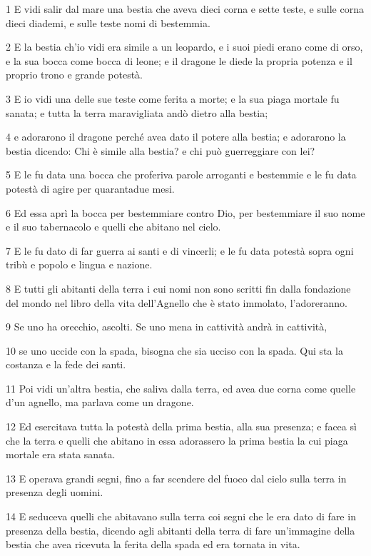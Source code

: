 \par 1 E vidi salir dal mare una bestia che aveva dieci corna e sette teste, e sulle corna dieci diademi, e sulle teste nomi di bestemmia.
\par 2 E la bestia ch'io vidi era simile a un leopardo, e i suoi piedi erano come di orso, e la sua bocca come bocca di leone; e il dragone le diede la propria potenza e il proprio trono e grande potestà.
\par 3 E io vidi una delle sue teste come ferita a morte; e la sua piaga mortale fu sanata; e tutta la terra maravigliata andò dietro alla bestia;
\par 4 e adorarono il dragone perché avea dato il potere alla bestia; e adorarono la bestia dicendo: Chi è simile alla bestia? e chi può guerreggiare con lei?
\par 5 E le fu data una bocca che proferiva parole arroganti e bestemmie e le fu data potestà di agire per quarantadue mesi.
\par 6 Ed essa aprì la bocca per bestemmiare contro Dio, per bestemmiare il suo nome e il suo tabernacolo e quelli che abitano nel cielo.
\par 7 E le fu dato di far guerra ai santi e di vincerli; e le fu data potestà sopra ogni tribù e popolo e lingua e nazione.
\par 8 E tutti gli abitanti della terra i cui nomi non sono scritti fin dalla fondazione del mondo nel libro della vita dell'Agnello che è stato immolato, l'adoreranno.
\par 9 Se uno ha orecchio, ascolti. Se uno mena in cattività andrà in cattività,
\par 10 se uno uccide con la spada, bisogna che sia ucciso con la spada. Qui sta la costanza e la fede dei santi.
\par 11 Poi vidi un'altra bestia, che saliva dalla terra, ed avea due corna come quelle d'un agnello, ma parlava come un dragone.
\par 12 Ed esercitava tutta la potestà della prima bestia, alla sua presenza; e facea sì che la terra e quelli che abitano in essa adorassero la prima bestia la cui piaga mortale era stata sanata.
\par 13 E operava grandi segni, fino a far scendere del fuoco dal cielo sulla terra in presenza degli uomini.
\par 14 E seduceva quelli che abitavano sulla terra coi segni che le era dato di fare in presenza della bestia, dicendo agli abitanti della terra di fare un'immagine della bestia che avea ricevuta la ferita della spada ed era tornata in vita.
